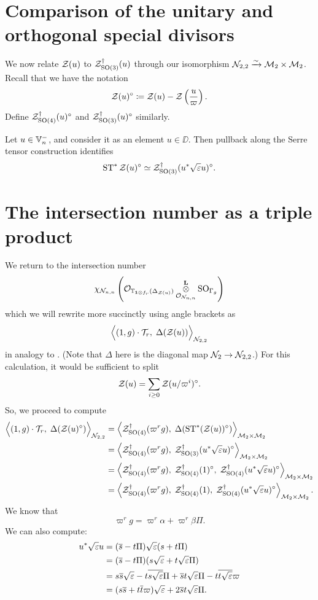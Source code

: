 \section{Comparison of the unitary and orthogonal special divisors}
We now relate $\mathcal Z(u)$ to $\mathcal Z^{\dagger}_{\operatorname{SO}(3)}(u)$ through our
isomorphism $\mathcal N_{2,2} \xrightarrow{\sim} \mathcal M_2 \times \mathcal M_2$.
Recall that we have the notation
\[ \mathcal Z(u)^\circ \coloneqq \mathcal Z(u) - \mathcal Z\left( \frac{u}{\varpi} \right). \]
Define $\mathcal Z^{\dagger}_{\operatorname{SO}(4)}(u)^\circ$ and $\mathcal Z^{\dagger}_{\operatorname{SO}(3)}(u)^\circ$ similarly.

\begin{conjecture}
  Let $u \in \mathbb V_n^-$, and consider it as an element $u \in \DD$.
  Then pullback along the Serre tensor construction identifies
  \[ \operatorname{ST}^\ast \mathcal Z(u)^\circ \simeq \mathcal Z^{\dagger}_{\operatorname{SO}(3)}(u^\ast \sqrt{\varepsilon} u)^\circ. \]
\end{conjecture}

\section{The intersection number as a triple product}
We return to the intersection number
\[ \chi_{\mathcal N_{n,n}} \left(
      \mathcal{O}_{\mathbb T_{\mathbf{1} \otimes f_r}(\Delta_{\mathcal Z(u)})}
      \mathop{\otimes}^{\mathbf{L}}_{\mathcal{O}_{\mathcal N_{n,n}}} \operatorname{SO}_{\Gamma_g} \right) \]
which we will rewrite more succinctly using angle brackets as
\[ \Big\langle (1,g) \cdot \mathcal{T}_r, \; \Delta(\mathcal Z(u)) \Big\rangle_{\mathcal N_{2,2}} \]
in analogy to \cite[\S6.1]{ref:AFLspherical}.
(Note that $\Delta$ here is the diagonal map $\mathcal N_2 \to \mathcal N_{2,2}$.)
For this calculation, it would be sufficient to split
\[ \mathcal Z(u) = \sum_{i \ge 0} \mathcal Z(u/\varpi^i)^\circ. \]
So, we proceed to compute
\begin{align*}
  \Big\langle (1,g) \cdot \mathcal{T}_r, \; \Delta(\mathcal Z(u)^\circ) \Big\rangle_{\mathcal N_{2,2}}
  &= \left< \mathcal Z^{\dagger}_{\operatorname{SO}(4)}(\varpi^r g), \; \Delta(\operatorname{ST}^\ast(\mathcal Z(u))^\circ) \right>_{\mathcal M_2 \times \mathcal M_2} \\
  &= \left< \mathcal Z^{\dagger}_{\operatorname{SO}(4)}(\varpi^r g), \; \mathcal Z^{\dagger}_{\operatorname{SO}(3)}(u^\ast \sqrt{\varepsilon} u)^\circ \right>_{\mathcal M_2 \times \mathcal M_2} \\
  &= \left< \mathcal Z^{\dagger}_{\operatorname{SO}(4)}(\varpi^r g), \; \mathcal Z^{\dagger}_{\operatorname{SO}(4)}(1)^\circ, \; \mathcal Z^{\dagger}_{\operatorname{SO}(4)}(u^\ast \sqrt{\varepsilon} u)^\circ \right>_{\mathcal M_2 \times \mathcal M_2} \\
  &= \left< \mathcal Z^{\dagger}_{\operatorname{SO}(4)}(\varpi^r g), \; \mathcal Z^{\dagger}_{\operatorname{SO}(4)}(1), \; \mathcal Z^{\dagger}_{\operatorname{SO}(4)}(u^\ast \sqrt{\varepsilon} u)^\circ \right>_{\mathcal M_2 \times \mathcal M_2}.
\end{align*}
We know that
\[ \varpi^r g = \varpi^r \alpha + \varpi^r \beta \Pi. \]
We can also compute:
\begin{align*}
  u^\ast \sqrt{\varepsilon} u
  &= (\overline s - t \Pi) \sqrt{\varepsilon} (s + t \Pi) \\
  &= (\overline s - t \Pi) (s \sqrt{\varepsilon} + t \sqrt{\varepsilon} \Pi) \\
  &= s \overline s \sqrt{\varepsilon} - t \overline{s\sqrt{\varepsilon}} \Pi + \overline s t \sqrt{\varepsilon} \Pi - t \overline{t \sqrt{\varepsilon}} \varpi \\
  &= (s \overline s + t \overline t \varpi) \sqrt{\varepsilon} + 2 \overline s t \sqrt{\varepsilon} \Pi.
\end{align*}

